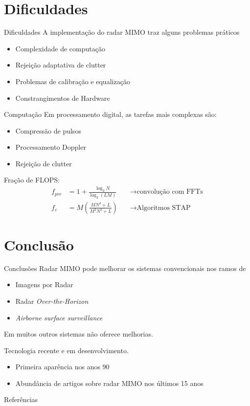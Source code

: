 \documentclass[portuguese]{beamer}
\begin{document}
\section{Dificuldades}

\begin{frame}{Dificuldades}
  A implementação do radar MIMO traz alguns problemas práticos
  \vspace{10pt}
  \begin{itemize}
    \item Complexidade de computação
	\item Rejeição adaptativa de clutter
	\item Problemas de calibração e equalização
	\item Constrangimentos de Hardware
  \end{itemize}
\end{frame}

\begin{frame}{Computação}
  Em processamento digital, as tarefas mais complexas são:
  \begin{itemize}
	\item Compressão de pulsos
	\item Processamento Doppler
	\item Rejeição de clutter
  \end{itemize}
  Fração de FLOPS:
  \begin{align*}
	f_{pre} &= 1+ \frac{\log_2 N}{\log_2 (LM)}\, &&\longrightarrow \textrm{convolução com FFTs}
 \\
	f_c &= M\left( \frac{MN^3+L}{M^2N^2+L} \right) \, &&\longrightarrow \textrm{Algoritmos STAP}
  \end{align*}
\end{frame}

\section{Conclusão}

\begin{frame}{Conclusões}
  Radar MIMO pode melhorar os sistemas convencionais nos ramos de
  \begin{itemize}
	\item Imagens por Radar
	\item Radar \textit{Over-the-Horizon} 
	\item \textit{Airborne surface surveillance}
  \end{itemize}
  Em muitos outros sistemas não oferece melhorias.

  \vspace{20pt}

  Tecnologia recente e em desenvolvimento.
  \begin{itemize}
	\item Primeira aparência nos anos 90
	\item Abundância de artigos sobre radar MIMO nos últimos 15 anos
  \end{itemize}

\end{frame}

\begin{frame}{Referências}
  \printbibliography
\end{frame}
\end{document}
